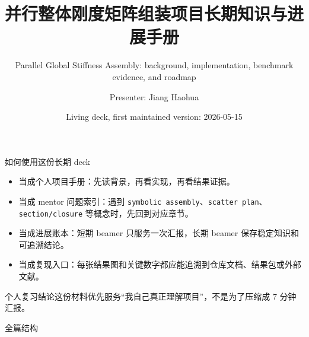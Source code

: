 \documentclass[UTF8,aspectratio=169,10pt]{ctexbeamer}
\title[PGSA Long-Term Beamer]{并行整体刚度矩阵组装项目长期知识与进展手册}
\subtitle{Parallel Global Stiffness Assembly: background, implementation, benchmark evidence, and roadmap}
\author{Presenter: Jiang Haohua}
\institute{Shanghai Jiao Tong University}
\date{Living deck, first maintained version: 2026-05-15}
\newcommand{\code}[1]{\texttt{#1}}
\newcommand{\takeaway}[1]{\begin{block}{个人复习结论}#1\end{block}}
\begin{document}
\begin{frame}
  \titlepage
\end{frame}

\begin{frame}{如何使用这份长期 deck}
\begin{itemize}
  \item 当成个人项目手册：先读背景，再看实现，再看结果证据。
  \item 当成 mentor 问题索引：遇到 \code{symbolic assembly}、\code{scatter plan}、\code{section/closure} 等概念时，先回到对应章节。
  \item 当成进展账本：短期 beamer 只服务一次汇报，长期 beamer 保存稳定知识和可追溯结论。
  \item 当成复现入口：每张结果图和关键数字都应能追溯到仓库文档、结果包或外部文献。
\end{itemize}
\takeaway{这份材料优先服务“我自己真正理解项目”，不是为了压缩成 7 分钟汇报。}
\end{frame}

\begin{frame}{全篇结构}
\tableofcontents
\end{frame}









\end{document}

